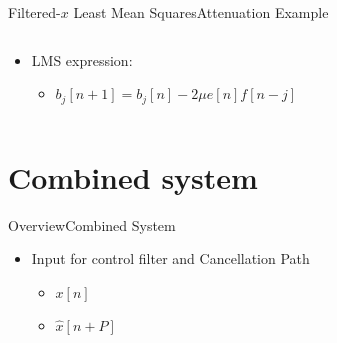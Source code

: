 \begin{frame}{Filtered-$x$ Least Mean Squares}{Attenuation Example}
	
	\begin{columns}
		\begin{column}{0.4\textwidth}			
				\begin{itemize}
					\item LMS expression:
							\begin{itemize}
								\item[] $b_j[n+1]=b_j[n]-2\mu e[n] f[n-j]$	
							\end{itemize}					
				\end{itemize}
	
			
			
			
			
		\end{column}
		\begin{column}{0.6\textwidth}
			\resizebox{1\columnwidth}{!}{
				
			}
			\resizebox{1\columnwidth}{!}{
				
		}
		\end{column}
	\end{columns}
	
	
\end{frame}






\section{Combined system}
\begin{frame}{Overview}{Combined System}	
	\begin{itemize}
		\item Input for control filter and Cancellation Path
		\begin{itemize}
			\item $x[n]$
			\item $\hat{x}[n+P]$
		\end{itemize}
	\end{itemize}
	\begin{center}
		\resizebox{0.9\columnwidth}{!}{		
			}
	\end{center}
\end{frame}



